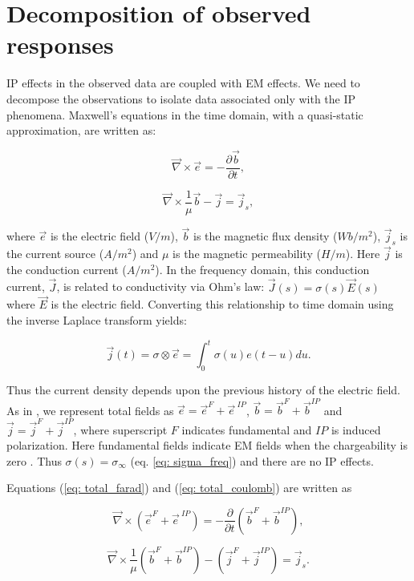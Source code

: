 \documentclass[extra,mreferee]{gji}
\newcommand{\curl}{{\vec \nabla}\times}
\newcommand {\J}{{\vec J}}
\newcommand {\E}{{\vec E}}
\newcommand{\siginf}{\sigma_\infty}
\renewcommand {\j}  { {\vec j} }
\renewcommand {\b}  { {\vec b} }
\newcommand {\e}  { {\vec e} }
\begin{document}
\section{Decomposition of observed responses}
IP effects in the observed data are coupled with EM effects. We need to decompose the observations to isolate data associated only with the IP phenomena.
Maxwell's equations in the time domain, with a quasi-static approximation, are written as:
\begin{linenomath*}
\begin{equation}
  \curl{\e} = -\frac{\partial \b}{\partial t},
  \label{eq: total_farad}
\end{equation}
\end{linenomath*}
\begin{linenomath*}
\begin{equation}
  \curl{\frac{1}{\mu}\b} - \j= \j_{s},
  \label{eq: total_coulomb}
\end{equation}
\end{linenomath*}
where $\e$ is the electric field ($V/m$), $\b$ is the magnetic flux density ($Wb/m^2$), $\j_{s}$ is the current source ($A/m^2$) and $\mu$ is the magnetic permeability ($H/m$). Here $\j$ is the conduction current ($A/m^2$). In the frequency domain, this conduction current, $\J$, is related to conductivity via Ohm’s law: $\J(s) = \sigma(s)\E(s)$ where $\E$ is the electric field.
Converting this relationship to time domain using the inverse Laplace transform yields:
\begin{linenomath*}
\begin{equation}
  \j(t) = \sigma \otimes \e = \int_0^t \sigma(u) e(t-u) du.
  \label{eq: ohms_law_convolution}
\end{equation}
\end{linenomath*}
Thus the current density depends upon the previous history of the electric field.
As in \cite{Smith1988a}, we represent total fields as $\e = \e^{F} + \e^{\ IP}$, $\b = \b^{F} + \b^{IP}$ and $\j = \j^{F} + \j^{IP}$, where superscript $F$ indicates fundamental and $IP$ is induced polarization.
Here fundamental fields indicate EM fields when the chargeability is zero . Thus  $\sigma(s) = \siginf$  (eq. \ref{eq: sigma_freq}) and there are no IP effects.

Equations (\ref{eq: total_farad}) and (\ref{eq: total_coulomb}) are written as
\begin{linenomath*}
\begin{equation}
  \curl({\e^{F}+\e^{\ IP}}) = -\frac{\partial}{\partial t} (\b^{F}+\b^{IP}),
\end{equation}
\end{linenomath*}
\begin{linenomath*}
\begin{equation}
  \curl\frac{1}{\mu}(\b^{F}+\b^{IP}) - (\j^{F}+\j^{IP})= \j_{s}.
\end{equation}
\end{linenomath*}
\end{document}
